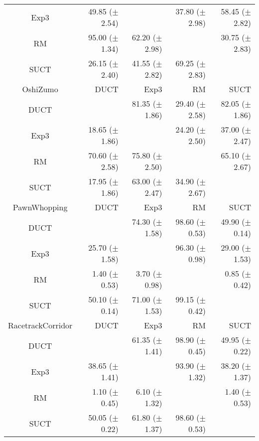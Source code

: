 \documentclass{article}
\begin{document}
\begin{table}
\begin{center}
\begin{tabular}{|c|rrrr|}
           Exp3    & 49.85 ($\pm$ 2.54)   &              & 37.80 ($\pm$ 2.98)   & 58.45 ($\pm$ 2.82)   \\
             RM    & 95.00 ($\pm$ 1.34)   & 62.20 ($\pm$ 2.98)   &              & 30.75 ($\pm$ 2.83)   \\
           SUCT    & 26.15 ($\pm$ 2.40)   & 41.55 ($\pm$ 2.82)   & 69.25 ($\pm$ 2.83)   &              \\
\hline
\hline
       OshiZumo   &       DUCT   &       Exp3   &         RM   &       SUCT   \\
\hline
           DUCT    &              & 81.35 ($\pm$ 1.86)   & 29.40 ($\pm$ 2.58)   & 82.05 ($\pm$ 1.86)   \\
           Exp3    & 18.65 ($\pm$ 1.86)   &              & 24.20 ($\pm$ 2.50)   & 37.00 ($\pm$ 2.47)   \\
             RM    & 70.60 ($\pm$ 2.58)   & 75.80 ($\pm$ 2.50)   &              & 65.10 ($\pm$ 2.67)   \\
           SUCT    & 17.95 ($\pm$ 1.86)   & 63.00 ($\pm$ 2.47)   & 34.90 ($\pm$ 2.67)   &              \\
\hline
\hline
   PawnWhopping   &       DUCT   &       Exp3   &         RM   &       SUCT   \\
\hline
           DUCT    &              & 74.30 ($\pm$ 1.58)   & 98.60 ($\pm$ 0.53)   & 49.90 ($\pm$ 0.14)   \\
           Exp3    & 25.70 ($\pm$ 1.58)   &              & 96.30 ($\pm$ 0.98)   & 29.00 ($\pm$ 1.53)   \\
             RM    & 1.40 ($\pm$ 0.53)   & 3.70 ($\pm$ 0.98)   &              & 0.85 ($\pm$ 0.42)   \\
           SUCT    & 50.10 ($\pm$ 0.14)   & 71.00 ($\pm$ 1.53)   & 99.15 ($\pm$ 0.42)   &              \\
\hline
\hline
RacetrackCorridor   &       DUCT   &       Exp3   &         RM   &       SUCT   \\
\hline
           DUCT    &              & 61.35 ($\pm$ 1.41)   & 98.90 ($\pm$ 0.45)   & 49.95 ($\pm$ 0.22)   \\
           Exp3    & 38.65 ($\pm$ 1.41)   &              & 93.90 ($\pm$ 1.32)   & 38.20 ($\pm$ 1.37)   \\
             RM    & 1.10 ($\pm$ 0.45)   & 6.10 ($\pm$ 1.32)   &              & 1.40 ($\pm$ 0.53)   \\
           SUCT    & 50.05 ($\pm$ 0.22)   & 61.80 ($\pm$ 1.37)   & 98.60 ($\pm$ 0.53)   &              \\

\end{tabular}
\end{center}
\end{table}
\end{document}

